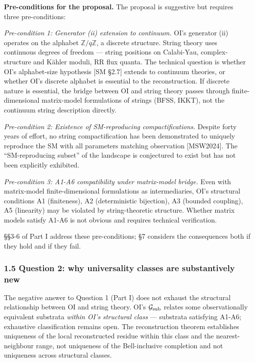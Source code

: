 \documentclass[
]{article}
\begin{document}
\textbf{Pre-conditions for the proposal.} The proposal is suggestive but
requires three pre-conditions:

\emph{Pre-condition 1: Generator (ii) extension to continuum.} OI's
generator (ii) operates on the alphabet \(\mathbb{Z}/q\mathbb{Z}\), a
discrete structure. String theory uses continuous degrees of freedom ---
string positions on Calabi-Yau, complex-structure and Kähler moduli, RR
flux quanta. The technical question is whether OI's alphabet-size
hypothesis {[}SM §2.7{]} extends to continuum theories, or whether OI's
discrete alphabet is essential to the reconstruction. If discrete nature
is essential, the bridge between OI and string theory passes through
finite-dimensional matrix-model formulations of strings (BFSS, IKKT),
not the continuum string description directly.

\emph{Pre-condition 2: Existence of SM-reproducing compactifications.}
Despite forty years of effort, no string compactification has been
demonstrated to uniquely reproduce the SM with all parameters matching
observation {[}MSW2024{]}. The ``SM-reproducing subset'' of the
landscape is conjectured to exist but has not been explicitly exhibited.

\emph{Pre-condition 3: A1-A6 compatibility under matrix-model bridge.}
Even with matrix-model finite-dimensional formulations as
intermediaries, OI's structural conditions A1 (finiteness), A2
(deterministic bijection), A3 (bounded coupling), A5 (linearity) may be
violated by string-theoretic structure. Whether matrix models satisfy
A1-A6 is not obvious and requires technical verification.

§§3-6 of Part I address these pre-conditions; §7 considers the
consequences both if they hold and if they fail.

\hypertarget{question-2-why-universality-classes-are-substantively-new}{%
\subsubsection{1.5 Question 2: why universality classes are
substantively
new}\label{question-2-why-universality-classes-are-substantively-new}}

The negative answer to Question 1 (Part I) does not exhaust the
structural relationship between OI and string theory. OI's
\(\mathcal{G}_{\rm sub}\) relates some observationally equivalent
substrata \emph{within OI's structural class} --- substrata satisfying
A1-A6; exhaustive classification remains open. The reconstruction
theorem establishes uniqueness of the local reconstructed residue within
this class and the nearest-neighbour range, not uniqueness of the
Bell-inclusive completion and not uniqueness across structural classes.
\end{document}
